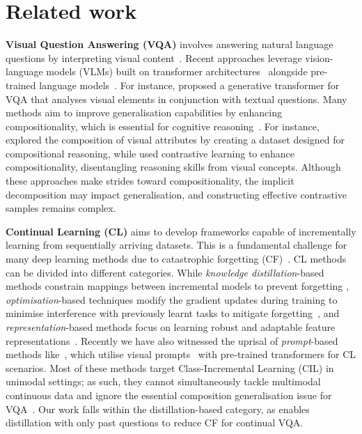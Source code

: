 \section{Related work}
\label{sec:related}
\noindent\textbf{Visual Question Answering (VQA)} involves answering natural language questions by interpreting visual content~\cite{antol2015vqa,Naik_2023_ICCV,Li_2024_CVPR}. Recent approaches leverage vision-language models (VLMs) built on transformer architectures~\citep{fields2023vision, shi2024non, xiao2022video, lei2021less, cheng2023vindlu} alongside pre-trained language models~\citep{yang2022zero, yu2023self}. For instance, \citet{cho2021unifying} proposed a generative transformer for VQA that analyses visual elements in conjunction with textual questions. Many methods aim to improve generalisation capabilities by enhancing compositionality, which is essential for cognitive reasoning~\citep{keysers2019measuring, lake2017building}. For instance, \citet{johnson2017clevr} explored the composition of visual attributes by creating a dataset designed for compositional reasoning, while \citet{whitehead2021separating} used contrastive learning to enhance compositionality, disentangling reasoning skills from visual concepts. Although these approaches make strides toward compositionality, the implicit decomposition may impact generalisation, and constructing effective contrastive samples remains complex.
 
\noindent \textbf{Continual Learning (CL)} aims to develop frameworks capable of incrementally learning from sequentially arriving datasets. This is a fundamental challenge for many deep learning methods due to catastrophic forgetting (CF)~\citep{mcclelland1995there}. CL methods can be divided into different categories. While \emph{knowledge distillation}-based methods constrain mappings between incremental models to prevent forgetting \citep{li2017learning, icarl, 8953661, 9880426, douillard2020podnetpooledoutputsdistillation,Kang2022afc}, \emph{optimisation}-based techniques modify the gradient updates during training to minimise interference with previously learnt tasks to mitigate forgetting~\cite{lopez2017gradient,chaudhry2018efficient, saha2021gradient, Yang_2023_ICCV}, and \emph{representation}-based methods focus on learning robust and adaptable feature representations~\cite{gao2023unified,foret2020sharpness,ermis2022memory,douillard2022dytox}. Recently we have also witnessed the uprisal of \emph{prompt}-based methods like~\citep{wang2022learning, wang2022dualprompt, wang2022s, smith2023coda}, which utilise visual prompts~\citep{liu2023pre} with pre-trained transformers for CL scenarios. Most of these methods target Class-Incremental Learning (CIL) in unimodal settings; as such, they cannot simultaneously tackle multimodal continuous data and ignore the essential composition generalisation issue for VQA~\citep{zhang2023vqacl, nikandrou2022task}. Our work falls within the distillation-based category, as \qstmethodshort{} enables distillation with only past questions to reduce CF for continual VQA.

